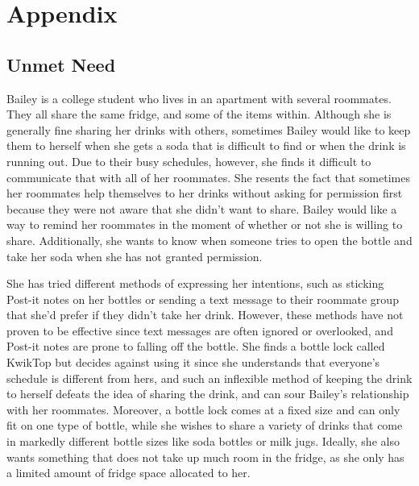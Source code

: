 \documentclass[12pt]{article}
\begin{document}
		\section*{Appendix}
		\subsection*{Unmet Need}
		Bailey is a college student who lives in an apartment with several roommates. They all share the same fridge, and some of the items within. Although she is generally fine sharing her drinks with others, sometimes Bailey would like to keep them to herself when she gets a soda that is difficult to find or when the drink is running out. Due to their busy schedules, however, she finds it difficult to communicate that with all of her roommates. She resents the fact that sometimes her roommates help themselves to her drinks without asking for permission first because they were not aware that she didn't want to share. Bailey would like a way to remind her roommates in the moment of whether or not she is willing to share. Additionally, she wants to know when someone tries to open the bottle and take her soda when she has not granted permission.
		
		She has tried different methods of expressing her intentions, such as sticking Post-it notes on her bottles or sending a text message to their roommate group that she'd prefer if they didn't take her drink. However, these methods have not proven to be effective since text messages are often ignored or overlooked, and Post-it notes are prone to falling off the bottle. She finds a bottle lock called KwikTop but decides against using it since she understands that everyone’s schedule is different from hers, and such an inflexible method of keeping the drink to herself defeats the idea of sharing the drink, and can sour Bailey’s relationship with her roommates. Moreover, a bottle lock comes at a fixed size and can only fit on one type of bottle, while she wishes to share a variety of drinks that come in markedly different bottle sizes like soda bottles or milk jugs. Ideally, she also wants something that does not take up much room in the fridge, as she only has a limited amount of fridge space allocated to her.
		
\end{document}
